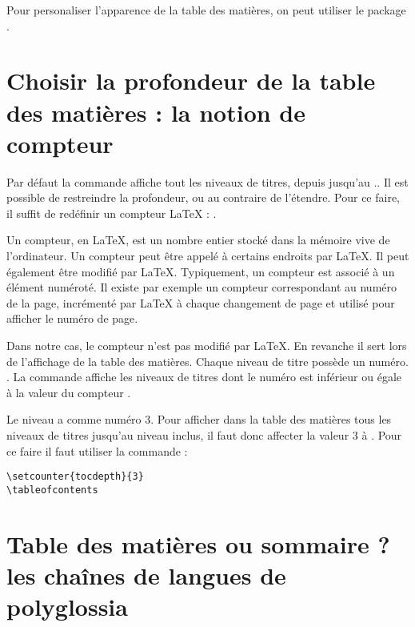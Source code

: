 \begin{anedocte}

Pour personaliser l'apparence de la table des matières, on peut utiliser le package . 
\end{anedocte}

\section[Choix de la profondeur]{Choisir la profondeur de la table des matières : la notion de compteur}\label{tocdepth}

Par défaut la commande  affiche tout les niveaux de titres, depuis  jusqu'au .. Il est possible de restreindre la profondeur, ou au contraire de l'étendre. Pour ce faire, il suffit de redéfinir un compteur \LaTeX{} : .

Un compteur, en \LaTeX{}, est un nombre entier stocké dans la mémoire vive de l'ordinateur. Un compteur peut être appelé à certains endroits par \LaTeX{}. Il peut également être modifié par \LaTeX{}. Typiquement, un compteur est associé à un élément numéroté. Il existe par exemple un compteur  correspondant au numéro de la page, incrémenté par \LaTeX{} à chaque changement de page et utilisé pour afficher le numéro de page.\label{compteur}

Dans notre cas, le compteur  n'est pas modifié par \LaTeX{}. En revanche il sert lors de l'affichage de la table des matières. Chaque niveau de titre possède un numéro. . La commande  affiche les niveaux de titres dont le numéro est inférieur ou égale à la valeur du compteur .

Le niveau  a comme numéro 3. Pour afficher dans la table des matières tous les niveaux de titres jusqu'au niveau  inclus, il faut donc affecter la valeur 3 à  . Pour ce faire il faut utiliser la commande  :

\begin{verbatim}
\setcounter{tocdepth}{3}
\tableofcontents
\end{verbatim}

\section[Table des matières ou sommaire ?]{Table des matières ou sommaire ? les chaînes de langues de polyglossia}

